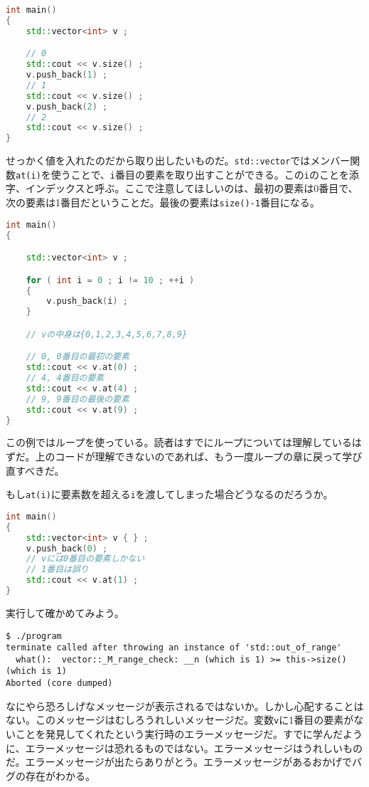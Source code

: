 \begin{lstlisting}[language={C++}]
int main()
{
    std::vector<int> v ;

    // 0
    std::cout << v.size() ;
    v.push_back(1) ;
    // 1
    std::cout << v.size() ;
    v.push_back(2) ;
    // 2
    std::cout << v.size() ;
}
\end{lstlisting}

せっかく値を入れたのだから取り出したいものだ。\texttt{std::vector}ではメンバー関数\texttt{at(i)}を使うことで、\texttt{i}番目の要素を取り出すことができる。この\texttt{i}のことを添字、インデックスと呼ぶ。ここで注意してほしいのは、最初の要素は0番目で、次の要素は1番目だということだ。最後の要素は\texttt{size()-1}番目になる。

\begin{lstlisting}[language={C++}]
int main()
{

    std::vector<int> v ;

    for ( int i = 0 ; i != 10 ; ++i )
    {
        v.push_back(i) ;
    }

    // vの中身は{0,1,2,3,4,5,6,7,8,9}

    // 0, 0番目の最初の要素
    std::cout << v.at(0) ;
    // 4, 4番目の要素
    std::cout << v.at(4) ;
    // 9, 9番目の最後の要素
    std::cout << v.at(9) ;
}
\end{lstlisting}

この例ではループを使っている。読者はすでにループについては理解しているはずだ。上のコードが理解できないのであれば、もう一度ループの章に戻って学び直すべきだ。

もし\texttt{at(i)}に要素数を超える\texttt{i}を渡してしまった場合どうなるのだろうか。

\begin{lstlisting}[language={C++}]
int main()
{
    std::vector<int> v { } ;
    v.push_back(0) ;
    // vには0番目の要素しかない
    // 1番目は誤り
    std::cout << v.at(1) ;
}
\end{lstlisting}

実行して確かめてみよう。

\begin{lstlisting}[style=terminal]
$ ./program
terminate called after throwing an instance of 'std::out_of_range'
  what():  vector::_M_range_check: __n (which is 1) >= this->size() (which is 1)
Aborted (core dumped)
\end{lstlisting}

なにやら恐ろしげなメッセージが表示されるではないか。しかし心配することはない。このメッセージはむしろうれしいメッセージだ。変数\texttt{v}に1番目の要素がないことを発見してくれたという実行時のエラーメッセージだ。すでに学んだように、エラーメッセージは恐れるものではない。エラーメッセージはうれしいものだ。エラーメッセージが出たらありがとう。エラーメッセージがあるおかげでバグの存在がわかる。

